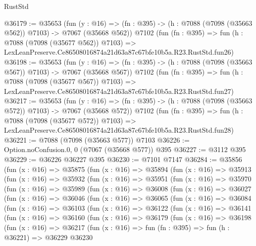 \begin{lexlean}{RustStd}
\begin{coremodule}
@36179 := @35653
    (fun (y : @16) => (fn : @395) -> (h : @7088 (@7098 (@35663 @562)) @7103) -> @7067 (@35668 @562))
    @7102
    (fun (fn : @395) =>
    fun (h : @7088 (@7098 (@35677 @562)) @7103) =>
    LexLeanPreserve.Ce86508016874a21d63a87c67bfe10b5a.R23.RustStd.fun26)
@36198 := @35653
    (fun (y : @16) => (fn : @395) -> (h : @7088 (@7098 (@35663 @567)) @7103) -> @7067 (@35668 @567))
    @7102
    (fun (fn : @395) =>
    fun (h : @7088 (@7098 (@35677 @567)) @7103) =>
    LexLeanPreserve.Ce86508016874a21d63a87c67bfe10b5a.R23.RustStd.fun27)
@36217 := @35653
    (fun (y : @16) => (fn : @395) -> (h : @7088 (@7098 (@35663 @572)) @7103) -> @7067 (@35668 @572))
    @7102
    (fun (fn : @395) =>
    fun (h : @7088 (@7098 (@35677 @572)) @7103) =>
    LexLeanPreserve.Ce86508016874a21d63a87c67bfe10b5a.R23.RustStd.fun28)
@36221 := @7088 (@7098 (@35663 @577)) @7103
@36226 := Option.noConfusion.{0, 0} (@7067 (@35668 @577)) @395
@36227 := @3112 @395
@36229 := @36226 @36227 @395
@36230 := @7101 @7147
@36284 := @35856
    (fun (x : @16) =>
    @35875
      (fun (x : @16) =>
      @35894
        (fun (x : @16) =>
        @35913
          (fun (x : @16) =>
          @35932
            (fun (x : @16) =>
            @35951
              (fun (x : @16) =>
              @35970
                (fun (x : @16) =>
                @35989
                  (fun (x : @16) =>
                  @36008
                    (fun (x : @16) =>
                    @36027
                      (fun (x : @16) =>
                      @36046
                        (fun (x : @16) =>
                        @36065
                          (fun (x : @16) =>
                          @36084
                            (fun (x : @16) =>
                            @36103
                              (fun (x : @16) =>
                              @36122
                                (fun (x : @16) =>
                                @36141
                                  (fun (x : @16) =>
                                  @36160
                                    (fun (x : @16) =>
                                    @36179
                                      (fun (x : @16) =>
                                      @36198
                                        (fun (x : @16) =>
                                        @36217
                                          (fun (x : @16) =>
                                          fun (fn : @395) =>
                                          fun (h : @36221) =>
                                          @36229
                                            @36230

\end{coremodule}
\end{lexlean}
